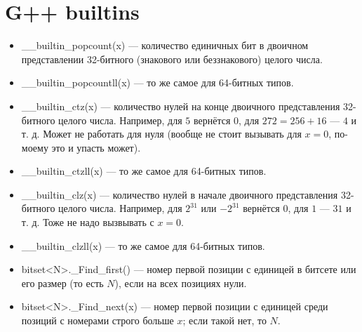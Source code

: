 \section{G++ builtins}

\begin{itemize}
\item  \_\_builtin\_popcount(x) --- количество единичных бит в двоичном представлении 32-битного (знакового или беззнакового) целого числа.
\item \_\_builtin\_popcountll(x) --- то же самое для 64-битных типов.
\item \_\_builtin\_ctz(x) --- количество нулей на конце двоичного представления 32-битного целого числа. Например, для $5$ вернётся $0$, для $272 = 256 + 16$ --- $4$ и т. д. Может не работать для нуля (вообще не стоит вызывать для $x = 0$, по-моему это и упасть может).
\item \_\_builtin\_ctzll(x) --- то же самое для 64-битных типов.
\item \_\_builtin\_clz(x) --- количество нулей в начале двоичного представления 32-битного целого числа. Например, для $2^{31}$ или $-2^{31}$ вернётся
$0$, для $1$ --- $31$ и т. д. Тоже не надо вызвывать с $x = 0$.
\item \_\_builtin\_clzll(x) --- то же самое для 64-битных типов.

\item bitset<N>.\_Find\_first() --- номер первой позиции с единицей в битсете или его размер
(то есть $N$), если на всех позициях нули.
\item bitset<N>.\_Find\_next(x) --- номер первой позиции с единицей среди позиций с номерами строго больше $x$; если такой нет, то $N$.
\end{itemize}
